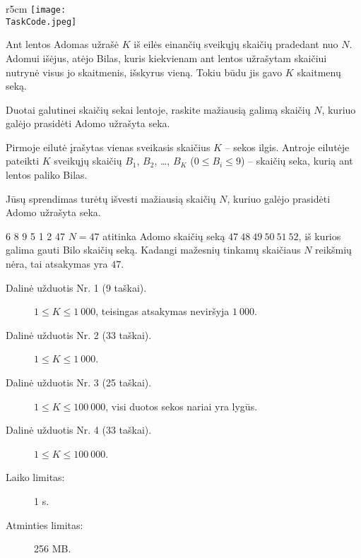 \documentclass{boi2014-lt}
\renewcommand{\TaskCode}{sequence}
\begin{document}
    \begin{wrapfigure}[5]{r}{5cm}
        \vspace{-24pt}
        \texttt{[image: \\TaskCode.jpeg]}
    \end{wrapfigure}

    Ant lentos Adomas užrašė $K$ iš eilės einančių sveikųjų skaičių pradedant
    nuo $N$. Adomui išėjus, atėjo Bilas, kuris kiekvienam ant lentos užrašytam
    skaičiui nutrynė visus jo skaitmenis, išskyrus vieną. Tokiu būdu jis gavo
    $K$ skaitmenų seką.

    \Task
    Duotai galutinei skaičių sekai lentoje, raskite mažiausią galimą skaičių $N$,
    kuriuo galėjo prasidėti Adomo užrašyta seka.

    \Input
    Pirmoje eilutė įrašytas vienas sveikasis skaičius $K$ -- sekos ilgis. Antroje
    eilutėje pateikti $K$ sveikųjų skaičių
    $B_1$, $B_2$, \dots, $B_K$ ($0 \le B_i \le 9$) -- skaičių seka, kurią ant
    lentos paliko Bilas.

    \Output
    Jūsų sprendimas turėtų išvesti mažiausią skaičių $N$, kuriuo galėjo prasidėti
    Adomo užrašyta seka.

    \Example

    \example
    {
        6 8 9 5 1 2
    }
    {
        47
    }
    {
        $N = 47$ atitinka Adomo skaičių seką $47\ 48\ 49\ 50\ 51\ 52$, iš kurios
        galima gauti Bilo skaičių seką. Kadangi mažesnių tinkamų
        skaičiaus $N$ reikšmių nėra, tai atsakymas yra $47$.
    }

    \Scoring

    \begin{description}
        \item[Dalinė užduotis Nr. 1 (9 taškai).] $1 \le K \le 1~000$, teisingas atsakymas neviršyja $1~000$.
        \item[Dalinė užduotis Nr. 2 (33 taškai).] $1 \le K \le 1~000$.
        \item[Dalinė užduotis Nr. 3 (25 taškai).] $1 \le K \le 100~000$, visi duotos sekos nariai yra lygūs.
        \item[Dalinė užduotis Nr. 4 (33 taškai).] $1 \le K \le 100~000$.
    \end{description}

    \Constraints

    \begin{description}
        \item[Laiko limitas:] 1 s.
        \item[Atminties limitas:] 256 MB.
    \end{description}
\end{document}
